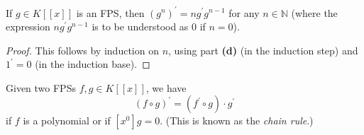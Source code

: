 \begin{lemma}
\label{lem.fps.deriv.rules.f}
\leanhelper
\leanok
If $g\in K\left[  \left[  x\right]  \right]  $ is an FPS, then
$\left(  g^{n}\right)  ^{\prime}=ng^{\prime}g^{n-1}$ for any $n\in\mathbb{N}$
(where the expression $ng^{\prime}g^{n-1}$ is to be understood as $0$ if
$n=0$).
\end{lemma}

\begin{proof}
\leanok
This follows by induction on $n$, using part \textbf{(d)} (in the
induction step) and $1^{\prime}=0$ (in the induction base).
\end{proof}

\begin{lemma}
\label{lem.fps.deriv.rules.g}
\leanhelper
\leanok
Given two FPSs $f,g\in K\left[  \left[  x\right]  \right]  $, we
have
\[
\left(  f\circ g\right)  ^{\prime}=\left(  f^{\prime}\circ g\right)  \cdot
g^{\prime}%
\]
if $f$ is a polynomial or if $\left[  x^{0}\right]  g=0$. (This is known as
the \emph{chain rule}.)
\end{lemma}

